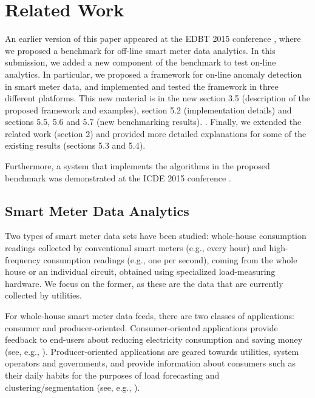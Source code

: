 \documentclass[prodmode,acmtods]{acmsmall}
\begin{document}
\section{Related Work}
\label{sec:relatedwork}

An earlier version of this paper appeared at the EDBT 2015 conference \cite{lgg+15}, where we proposed a benchmark for off-line smart meter data analytics.  In this submission, we added a new component of the benchmark to test on-line analytics.  In particular, we proposed a framework for on-line anomaly detection in smart meter data, and implemented and tested the framework in three different platforms.  This new material is in the new section 3.5 (description of the proposed framework and examples), section 5.2 (implementation details) and sections 5.5, 5.6 and 5.7 (new benchmarking results).  .  Finally, we extended the related work (section 2) and provided more detailed explanations for some of the existing results (sections 5.3 and 5.4).

Furthermore, a system that implements the algorithms in the proposed benchmark was demonstrated at the ICDE 2015 conference \cite{smas}.


\subsection{Smart Meter Data Analytics}

Two types of smart meter data sets have been studied: whole-house consumption readings collected by conventional smart meters (e.g., every hour) and high-frequency consumption readings (e.g., one per second), coming from the whole house or an individual circuit, obtained using specialized load-measuring hardware.  We focus on the former, as these are the data that are currently collected by utilities.

For whole-house smart meter data feeds, there are two classes of applications: consumer and producer-oriented.  Consumer-oriented applications provide feedback to end-users about reducing electricity consumption and saving money (see, e.g., \cite{birt,msw10,smith}).  Producer-oriented applications are geared towards utilities, system operators and governments, and provide information about consumers such as their daily habits for the purposes of load forecasting and clustering/segmentation (see, e.g., \cite{acf12,Gebru,ar13,omid,chicco,espinoza,frv05,ghe11,nezhad14,rvn10}).  
\end{document}

